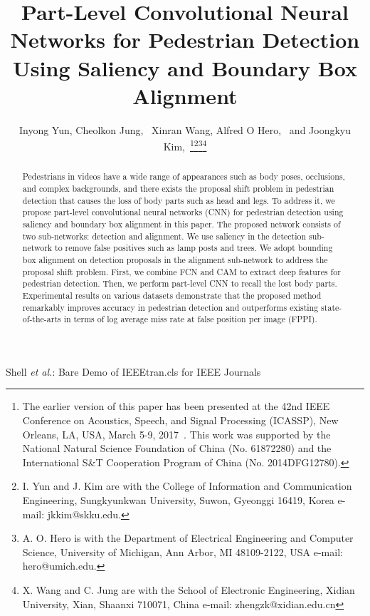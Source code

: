 \documentclass[journal]{IEEEtran}
\begin{document}
\title{Part-Level Convolutional Neural Networks for Pedestrian Detection Using Saliency and Boundary Box Alignment}

\author{Inyong Yun, Cheolkon Jung,~ Xinran Wang, Alfred O Hero,~ and Joongkyu Kim,~\thanks{The earlier version of this paper has been presented at the 42nd IEEE Conference on Acoustics, Speech, and Signal Processing (ICASSP), New Orleans, LA, USA, March 5-9, 2017~\cite{wang2017part}. This work was supported by the National Natural Science Foundation of China (No. 61872280) and the International S\&T Cooperation Program of China (No. 2014DFG12780).}\thanks{I. Yun and J. Kim are with the College of Information and Communication Engineering, Sungkyunkwan University, Suwon, Gyeonggi 16419, Korea e-mail: jkkim@skku.edu.}\thanks{A. O. Hero is with the Department of Electrical Engineering and Computer Science, University of Michigan, Ann Arbor, MI 48109-2122, USA e-mail: hero@umich.edu.}\thanks{X. Wang and C. Jung are with the School of Electronic Engineering, Xidian University, Xian, Shaanxi 710071, China e-mail: zhengzk@xidian.edu.cn}}


\markboth{} {Shell \MakeLowercase{\textit{et al.}}: Bare Demo of IEEEtran.cls for IEEE Journals}


\maketitle

\begin{abstract}
Pedestrians in videos have a wide range of appearances such as body poses, occlusions, and complex backgrounds, and there exists the proposal shift problem in pedestrian detection that causes the loss of body parts such as head and legs. To address it, we propose part-level convolutional neural networks (CNN) for pedestrian detection using saliency and boundary box alignment in this paper. The proposed network consists of two sub-networks: detection and alignment. We use saliency in the detection sub-network to remove false positives such as lamp posts and trees. We adopt bounding box alignment on detection proposals in the alignment sub-network to address the proposal shift problem. First, we combine FCN and CAM to extract deep features for pedestrian detection. Then, we perform part-level CNN to recall the lost body parts. Experimental results on various datasets demonstrate that the proposed method remarkably improves accuracy in pedestrian detection and outperforms existing state-of-the-arts in terms of log average miss rate at false position per image (FPPI).


\end{abstract}
\end{document}
